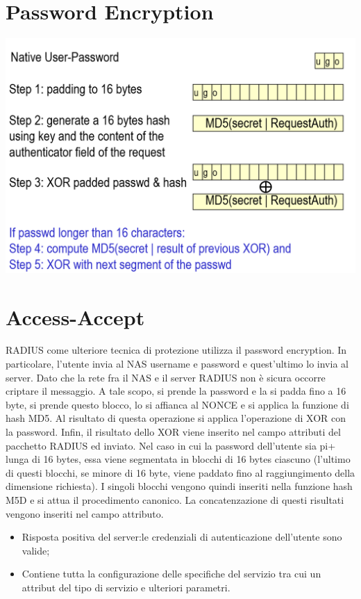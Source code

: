 \documentclass{book}
\theoremstyle{remark}
\begin{document}
\section{Password Encryption}
\begin{center}
	\includegraphics[scale=0.4]{passwordEncry.png}
\end{center}
\section{Access-Accept}
RADIUS come ulteriore tecnica di protezione utilizza il password encryption\@. In particolare, l'utente invia al NAS username e password e quest'ultimo lo invia al server\@. Dato che la rete fra il NAS e il server RADIUS non è sicura occorre criptare il messaggio\@.\newline
A tale scopo, si prende la password e la si padda fino a 16 byte, si prende questo blocco, lo si affianca al NONCE e si applica la funzione di hash MD5\@. Al risultato di questa operazione si applica l'operazione di XOR con la password\@. Infin, il risultato dello XOR viene inserito nel campo attributi del pacchetto RADIUS ed inviato\@.\newline
Nel caso in cui la password dell'utente sia pi+ lunga di 16 bytes, essa viene segmentata in blocchi di 16 bytes ciascuno (l'ultimo di questi blocchi, se minore di 16 byte, viene paddato fino al raggiungimento della dimensione richiesta)\@. I singoli blocchi vengono quindi inseriti nella funzione hash M5D e si attua il procedimento canonico\@. La concatenzazione di questi risultati vengono inseriti nel campo attributo\@.
\begin{itemize}
	\item Risposta positiva del server:\@allora le credenziali di autenticazione dell'utente sono valide;\@
	\item Contiene tutta la configurazione delle specifiche del servizio tra cui un attribut del tipo di servizio e ulteriori parametri\@.
\end{itemize}
\end{document}
